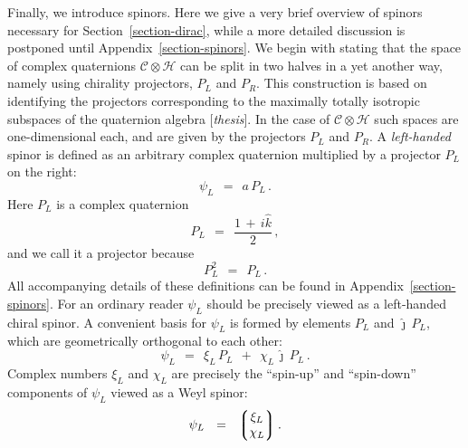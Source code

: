 \documentclass[epsfig,12pt]{article}
\newcommand{\jj}{\hat\jmath}
\newcommand{\kk}{\hat k}
\newcommand{\cC}{\mathcal{C}}
\newcommand{\cH}{\mathcal{H}}
\begin{document}
	Finally, we introduce spinors.
	Here we give a very brief overview of spinors necessary for Section~\ref{section-dirac}, while
	a more detailed discussion is postponed until Appendix~\ref{section-spinors}.
	We begin with stating that the space of complex quaternions $ \cC \otimes \cH $
	can be split in two halves in a yet another way, namely using chirality projectors, $ P_L $ and $ P_R $.
	This construction is based on identifying the projectors corresponding to the
	maximally totally isotropic subspaces of the quaternion algebra [\emph{thesis}].
	In the case of $ \cC \otimes \cH $ such spaces are one-dimensional each, and are given
	by the projectors $ P_L $ and $ P_R $.
	A \emph{left-handed} spinor is defined as an arbitrary complex quaternion multiplied by 
	a projector $ P_L $ on the right:
\begin{equation}
	\psi_L	~~=~~	a\,P_L\,.
\end{equation}
	Here $ P_L $ is a complex quaternion
\begin{equation}
	P_L	~~=~~	\frac{1 \,+\, i\kk} 2\,,
\end{equation}
	and we call it a projector because
\[
	P_L^2	~~=~~	P_L\,.
\]
	All accompanying details of these definitions can be found in Appendix~\ref{section-spinors}.
	For an ordinary reader $ \psi_L $ should be precisely viewed as a left-handed
	chiral spinor.
	A convenient basis for $ \psi_L $ is formed by elements $ P_L $ and $ \jj\,P_L $,
	which are geometrically orthogonal to each other:
\begin{equation}
\label{lbasis}
	\psi_L	~~=~~	\xi_L\,P_L  ~~+~~  \chi_L\,\jj\,P_L\,.
\end{equation}
	Complex numbers $ \xi_L $ and $ \chi_L $ are precisely the ``spin-up'' and ``spin-down''
	components of $ \psi_L $ viewed as a Weyl spinor:
\begin{equation}
	\psi_L	~~=~~	\left\lgroup
				\begin{matrix}
					\xi_L \\
					\chi_L
                		\end{matrix}
			\right\rgroup.
\end{equation}
\end{document}
